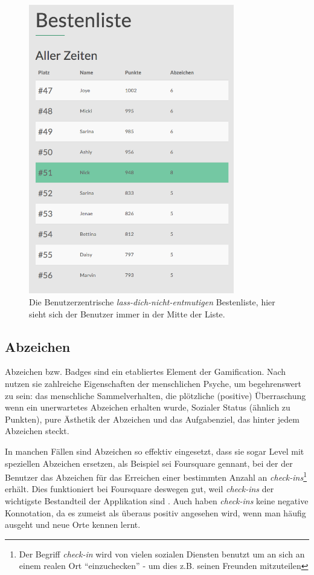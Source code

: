 \documentclass[12pt,twoside]{book}
\begin{document}
\begin{figure}[htbp]
    \centering
    \includegraphics[width=0.8\textwidth]{images/infoboard_leaderboard_user.png}
    \caption{Die Benutzerzentrische \textit{lass-dich-nicht-entmutigen} Bestenliste, hier sieht sich der Benutzer immer in der Mitte der Liste.}
    \label{fig:leaderboarduser}
\end{figure}

\subsection{Abzeichen}
Abzeichen bzw. Badges sind ein etabliertes Element der Gamification. Nach \citep[pp. 55]{zichermann2011gamification} nutzen sie zahlreiche Eigenschaften der menschlichen Psyche, um begehrenswert zu sein: das menschliche Sammelverhalten, die plötzliche (positive) Überraschung wenn ein unerwartetes Abzeichen erhalten wurde, Sozialer Status (ähnlich zu Punkten), pure Ästhetik der Abzeichen und das Aufgabenziel, das hinter jedem Abzeichen steckt.

In manchen Fällen sind Abzeichen so effektiv eingesetzt, dass sie sogar Level mit speziellen Abzeichen ersetzen, als Beispiel sei Foursquare gennant, bei der der Benutzer das Abzeichen für das Erreichen einer bestimmten Anzahl an \textit{check-ins}\footnote{Der Begriff \textit{check-in} wird von vielen sozialen Diensten benutzt um an sich an einem realen Ort ``einzuchecken'' - um dies z.B. seinen Freunden mitzuteilen} erhält. Dies funktioniert bei Foursquare deswegen gut, weil \textit{check-ins} der wichtigste Bestandteil der Applikation sind \citep[pp. 57]{zichermann2011gamification}. Auch haben \textit{check-ins} keine negative Konnotation, da es zumeist als überaus positiv angesehen wird, wenn man häufig ausgeht und neue Orte kennen lernt.
\end{document}
